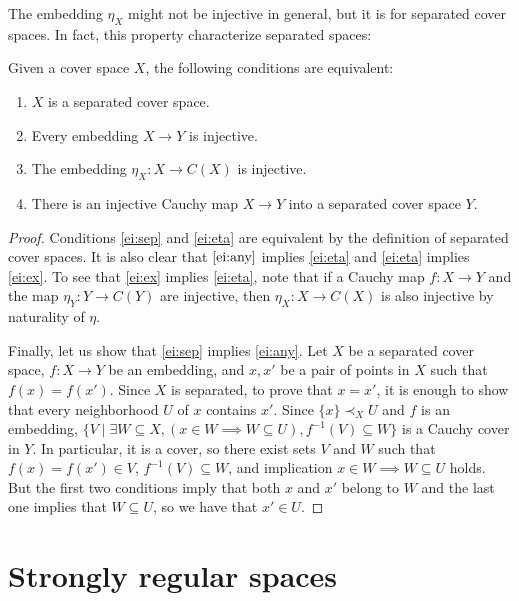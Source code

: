 \documentclass[reqno]{amsart}
\theoremstyle{definition}
\theoremstyle{remark}
\numberwithin{figure}{section}
\newcommand{\rb}{\prec}
\begin{document}
The embedding $\eta_X$ might not be injective in general, but it is for separated cover spaces.
In fact, this property characterize separated spaces:

\begin{prop}
Given a cover space $X$, the following conditions are equivalent:
\begin{enumerate}
\item \label{ei:sep} $X$ is a separated cover space.
\item \label{ei:any} Every embedding $X \to Y$ is injective.
\item \label{ei:eta} The embedding $\eta_X : X \to C(X)$ is injective.
\item \label{ei:ex} There is an injective Cauchy map $X \to Y$ into a separated cover space $Y$.
\end{enumerate}
\end{prop}
\begin{proof}
Conditions \eqref{ei:sep} and \eqref{ei:eta} are equivalent by the definition of separated cover spaces.
It is also clear that $\eqref{ei:any}$ implies \eqref{ei:eta} and \eqref{ei:eta} implies \eqref{ei:ex}.
To see that \eqref{ei:ex} implies \eqref{ei:eta}, note that if a Cauchy map $f : X \to Y$ and the map $\eta_Y : Y \to C(Y)$ are injective,
then $\eta_X : X \to C(X)$ is also injective by naturality of $\eta$.

Finally, let us show that \eqref{ei:sep} implies \eqref{ei:any}.
Let $X$ be a separated cover space, $f : X \to Y$ be an embedding, and $x,x'$ be a pair of points in $X$ such that $f(x) = f(x')$.
Since $X$ is separated, to prove that $x = x'$, it is enough to show that every neighborhood $U$ of $x$ contains $x'$.
Since $\{ x \} \rb_X U$ and $f$ is an embedding, $\{ V \mid \exists W \subseteq X, (x \in W \implies W \subseteq U), f^{-1}(V) \subseteq W \}$ is a Cauchy cover in $Y$.
In particular, it is a cover, so there exist sets $V$ and $W$ such that $f(x) = f(x') \in V$, $f^{-1}(V) \subseteq W$, and implication $x \in W \implies W \subseteq U$ holds.
But the first two conditions imply that both $x$ and $x'$ belong to $W$ and the last one implies that $W \subseteq U$, so we have that $x' \in U$.
\end{proof}

\section{Strongly regular spaces}
\label{sec:strongly-regular}
\end{document}
